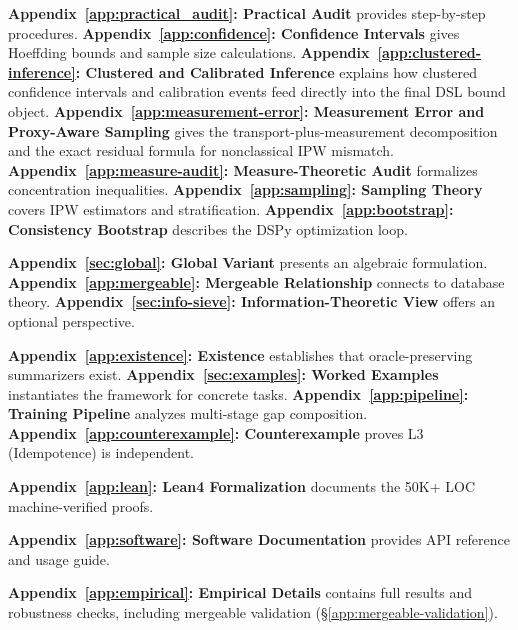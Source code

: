 \noindent\textbf{Appendix~\ref{app:practical_audit}: Practical Audit} provides step-by-step procedures.
\noindent\textbf{Appendix~\ref{app:confidence}: Confidence Intervals} gives Hoeffding bounds and sample size calculations.
\noindent\textbf{Appendix~\ref{app:clustered-inference}: Clustered and Calibrated Inference} explains how clustered confidence intervals and calibration events feed directly into the final DSL bound object.
\noindent\textbf{Appendix~\ref{app:measurement-error}: Measurement Error and Proxy-Aware Sampling} gives the transport-plus-measurement decomposition and the exact residual formula for nonclassical IPW mismatch.
\noindent\textbf{Appendix~\ref{app:measure-audit}: Measure-Theoretic Audit} formalizes concentration inequalities.
\noindent\textbf{Appendix~\ref{app:sampling}: Sampling Theory} covers IPW estimators and stratification.
\noindent\textbf{Appendix~\ref{app:bootstrap}: Consistency Bootstrap} describes the DSPy optimization loop.

\noindent\textbf{Appendix~\ref{sec:global}: Global Variant} presents an algebraic formulation.
\noindent\textbf{Appendix~\ref{app:mergeable}: Mergeable Relationship} connects to database theory.
\noindent\textbf{Appendix~\ref{sec:info-sieve}: Information-Theoretic View} offers an optional perspective.

\noindent\textbf{Appendix~\ref{app:existence}: Existence} establishes that oracle-preserving summarizers exist.
\noindent\textbf{Appendix~\ref{sec:examples}: Worked Examples} instantiates the framework for concrete tasks.
\noindent\textbf{Appendix~\ref{app:pipeline}: Training Pipeline} analyzes multi-stage gap composition.
\noindent\textbf{Appendix~\ref{app:counterexample}: Counterexample} proves L3 (Idempotence) is independent.

\noindent\textbf{Appendix~\ref{app:lean}: Lean4 Formalization} documents the 50K+ LOC machine-verified proofs.

\noindent\textbf{Appendix~\ref{app:software}: Software Documentation} provides API reference and usage guide.

\noindent\textbf{Appendix~\ref{app:empirical}: Empirical Details} contains full results and robustness checks, including mergeable validation (\S\ref{app:mergeable-validation}).

\medskip




